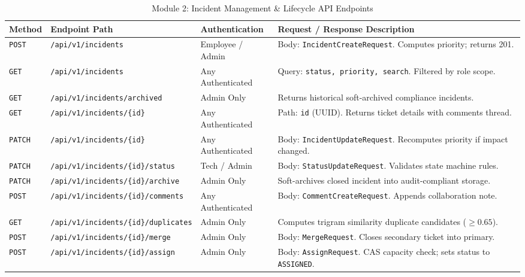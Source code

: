 \documentclass[11pt,a4paper,oneside]{report}
\begin{document}
\begin{table}[H]
\centering
\scriptsize
\caption{Module 2: Incident Management \& Lifecycle API Endpoints}
\label{tab:app_routes_m2}
\begin{tabular}{p{1.2cm}p{5.5cm}p{2.5cm}p{5.0cm}}
\toprule
\textbf{Method} & \textbf{Endpoint Path} & \textbf{Authentication} & \textbf{Request / Response Description} \\
\midrule
\texttt{POST} & \texttt{/api/v1/incidents} & Employee / Admin & Body: \texttt{IncidentCreateRequest}. Computes priority; returns 201. \\
\texttt{GET} & \texttt{/api/v1/incidents} & Any Authenticated & Query: \texttt{status, priority, search}. Filtered by role scope. \\
\texttt{GET} & \texttt{/api/v1/incidents/archived} & Admin Only & Returns historical soft-archived compliance incidents. \\
\texttt{GET} & \texttt{/api/v1/incidents/\{id\}} & Any Authenticated & Path: \texttt{id} (UUID). Returns ticket details with comments thread. \\
\texttt{PATCH} & \texttt{/api/v1/incidents/\{id\}} & Any Authenticated & Body: \texttt{IncidentUpdateRequest}. Recomputes priority if impact changed. \\
\texttt{PATCH} & \texttt{/api/v1/incidents/\{id\}/status} & Tech / Admin & Body: \texttt{StatusUpdateRequest}. Validates state machine rules. \\
\texttt{PATCH} & \texttt{/api/v1/incidents/\{id\}/archive} & Admin Only & Soft-archives closed incident into audit-compliant storage. \\
\texttt{POST} & \texttt{/api/v1/incidents/\{id\}/comments} & Any Authenticated & Body: \texttt{CommentCreateRequest}. Appends collaboration note. \\
\texttt{GET} & \texttt{/api/v1/incidents/\{id\}/duplicates}& Admin Only & Computes trigram similarity duplicate candidates ($\ge 0.65$). \\
\texttt{POST} & \texttt{/api/v1/incidents/\{id\}/merge} & Admin Only & Body: \texttt{MergeRequest}. Closes secondary ticket into primary. \\
\texttt{POST} & \texttt{/api/v1/incidents/\{id\}/assign} & Admin Only & Body: \texttt{AssignRequest}. CAS capacity check; sets status to \texttt{ASSIGNED}. \\
\bottomrule
\end{tabular}
\end{table}
\end{document}
